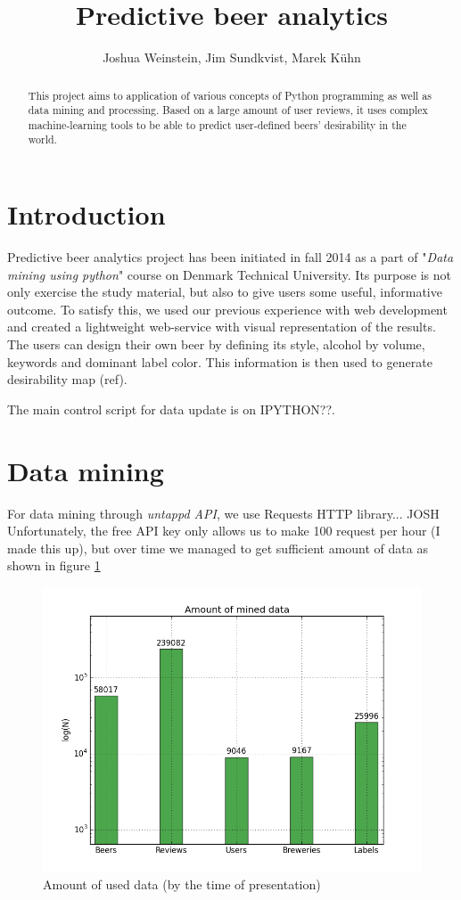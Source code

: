 \documentclass[10pt]{IEEEtran}
\title{Predictive beer analytics}
\author{Joshua Weinstein, Jim Sundkvist, Marek Kühn}
\begin{document}
\maketitle

\begin{abstract}
This project aims to application of various concepts of Python programming as well as data mining and processing.
Based on a large amount of user reviews, it uses complex machine-learning tools to be able to predict user-defined beers' desirability in the world. 
\end{abstract}

\section{Introduction}

Predictive beer analytics project has been initiated in fall 2014 as a part of "\textit{Data mining using python}" course on Denmark Technical University. Its purpose is not only exercise the study material, but also to give users some useful, informative outcome. To satisfy this, we used our previous experience with web development and created a lightweight web-service with visual representation of the results. The users can design their own beer by defining its style, alcohol by volume, keywords and dominant label color. This information is then used to generate desirability map (ref).

The main control script for data update is on IPYTHON??.

\section{Data mining}
For data mining through \textit{untappd API}, we use Requests HTTP library... JOSH Unfortunately, the free API key only allows us to make 100 request per hour (I made this up), but over time we managed to get sufficient amount of data as shown in figure \ref{fig:dataQuantity} 
\begin{figure}[h]
  \centering
  \includegraphics[width=\columnwidth]{./graphics/quantity.png}
  \caption{Amount of used data (by the time of presentation)}
  \label{fig:dataQuantity}
\end{figure}
\end{document}
